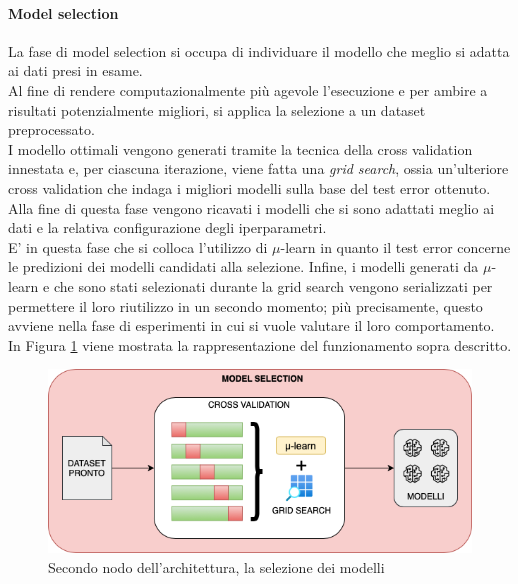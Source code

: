 \documentclass[12pt]{report}
\theoremstyle{definition}
\begin{document}
\paragraph{Model selection}
La fase di model selection si occupa di individuare il modello che meglio si adatta ai dati presi in esame.
\\
Al fine di rendere computazionalmente più agevole l'esecuzione e per ambire a risultati potenzialmente migliori, si applica la selezione a un dataset preprocessato.
\\
I modello ottimali vengono generati tramite la tecnica della cross validation innestata e, per ciascuna iterazione, viene fatta una \textit{grid search}, ossia un'ulteriore cross validation che indaga i migliori modelli sulla base del test error ottenuto.
\\
Alla fine di questa fase vengono ricavati i modelli che si sono adattati meglio ai dati e la relativa configurazione degli iperparametri.
\\
E' in questa fase che si colloca l'utilizzo di $\mu$-learn in quanto il test error concerne le predizioni dei modelli candidati alla selezione.
Infine, i modelli generati da $\mu$-learn e che sono stati selezionati durante la grid search vengono serializzati per permettere il loro riutilizzo in un secondo momento; più precisamente, questo avviene nella fase di esperimenti in cui si vuole valutare il loro comportamento.
\\
In Figura \ref{selectionmodel} viene mostrata la rappresentazione del funzionamento sopra descritto.
\begin{figure}
    \centering
    \includegraphics[scale=0.6]{images/modelselectionmodule.png}
    \caption{Secondo nodo dell'architettura, la selezione dei modelli}
    \label{selectionmodel}
\end{figure}
\end{document}
